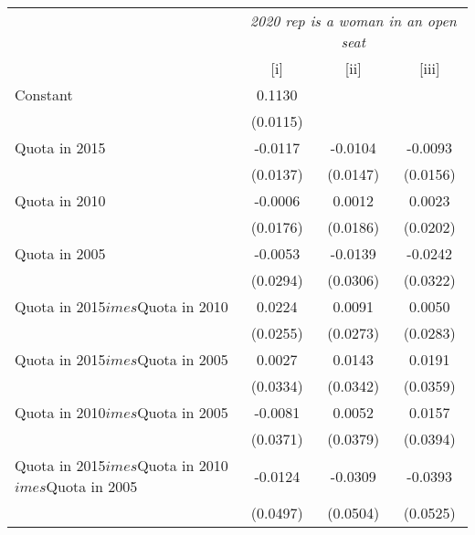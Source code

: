 
\begingroup
\centering
\begin{tabular}{lccc}
   \toprule
    & \multicolumn{3}{c}{\textit{2020 rep is a woman in an open seat}}\\
                                                           & [i]      & [ii]          & [iii]\\  
   \midrule 
   Constant                                                & 0.1130   &               &   \\   
                                                           & (0.0115) &               &   \\   
   Quota in 2015                                           & -0.0117  & -0.0104       & -0.0093\\   
                                                           & (0.0137) & (0.0147)      & (0.0156)\\   
   Quota in 2010                                           & -0.0006  & 0.0012        & 0.0023\\   
                                                           & (0.0176) & (0.0186)      & (0.0202)\\   
   Quota in 2005                                           & -0.0053  & -0.0139       & -0.0242\\   
                                                           & (0.0294) & (0.0306)      & (0.0322)\\   
   Quota in 2015$	imes$Quota in 2010                      & 0.0224   & 0.0091        & 0.0050\\   
                                                           & (0.0255) & (0.0273)      & (0.0283)\\   
   Quota in 2015$	imes$Quota in 2005                      & 0.0027   & 0.0143        & 0.0191\\   
                                                           & (0.0334) & (0.0342)      & (0.0359)\\   
   Quota in 2010$	imes$Quota in 2005                      & -0.0081  & 0.0052        & 0.0157\\   
                                                           & (0.0371) & (0.0379)      & (0.0394)\\   
   Quota in 2015$	imes$Quota in 2010$	imes$Quota in 2005 & -0.0124  & -0.0309       & -0.0393\\   
                                                           & (0.0497) & (0.0504)      & (0.0525)\\   

\end{tabular}
